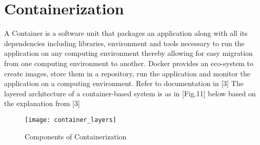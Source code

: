 \section{Containerization}

\begin{flushleft}
A Container is a software unit that packages an application along with all its dependencies including libraries, environment and tools necessary to run the application on any computing environment thereby allowing for easy migration from one computing environment to another. Docker provides an eco-system to create images, store them in a repository, run the application and monitor the application on a computing environment. Refer to documentation in [3]
The layered architecture of a container-based system is as in [Fig.11] below based on the explanation from [3]
\end{flushleft}

\begin{figure}
    \centering
    \texttt{[image: container\_layers]}
    \label{fig:figure9}
    \caption{Components of Containerization}
\end{figure}

